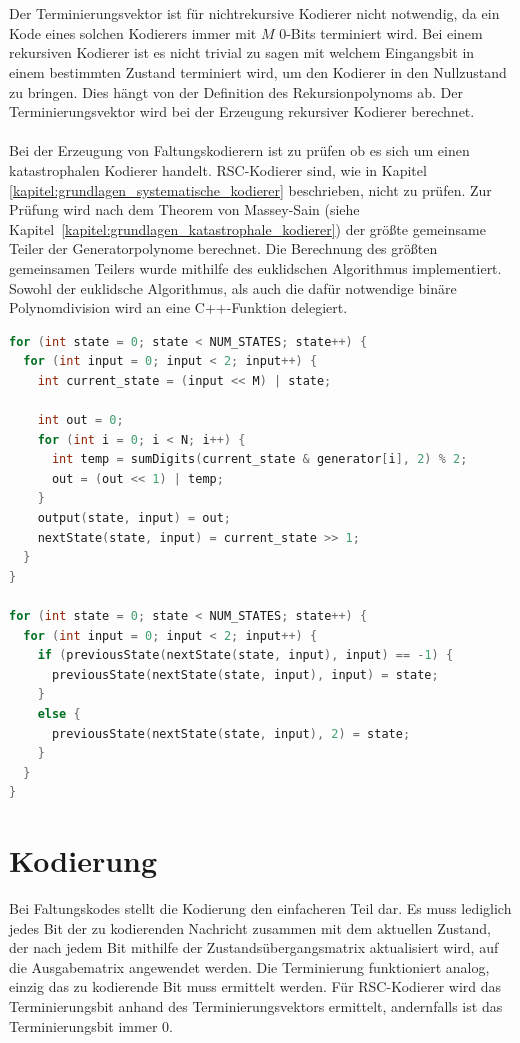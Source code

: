\\
\\
Der Terminierungsvektor ist für nichtrekursive Kodierer nicht notwendig, da ein Kode eines solchen Kodierers immer mit $M$ 0-Bits terminiert wird. Bei einem rekursiven Kodierer ist es nicht trivial zu sagen mit welchem Eingangsbit in einem bestimmten Zustand terminiert wird, um den Kodierer in den Nullzustand zu bringen. Dies hängt von der Definition des Rekursionpolynoms ab. Der Terminierungsvektor wird bei der Erzeugung rekursiver Kodierer berechnet.
\\
\\
Bei der Erzeugung von Faltungskodierern ist zu prüfen ob es sich um einen katastrophalen Kodierer handelt. RSC-Kodierer sind, wie in Kapitel \ref{kapitel:grundlagen_systematische_kodierer} beschrieben, nicht zu prüfen. Zur Prüfung wird nach dem Theorem von Massey-Sain (siehe Kapitel~\ref{kapitel:grundlagen_katastrophale_kodierer}) der größte gemeinsame Teiler der Generatorpolynome berechnet. Die Berechnung des größten gemeinsamen Teilers wurde mithilfe des euklidschen Algorithmus implementiert. Sowohl der euklidsche Algorithmus, als auch die dafür notwendige binäre Polynomdivision wird an eine C++-Funktion delegiert.
\begin{lstlisting}[language=C++,caption=Codeausschnitt der Implementierung der Erzeugung von Faltungskodierer, label={lst:generate_coder}, float=!th, basicstyle=\ttfamily\scriptsize]
for (int state = 0; state < NUM_STATES; state++) {
  for (int input = 0; input < 2; input++) {
    int current_state = (input << M) | state;

    int out = 0;
    for (int i = 0; i < N; i++) {
      int temp = sumDigits(current_state & generator[i], 2) % 2;
      out = (out << 1) | temp;
    }
    output(state, input) = out;
    nextState(state, input) = current_state >> 1;
  }
}

for (int state = 0; state < NUM_STATES; state++) {
  for (int input = 0; input < 2; input++) {
    if (previousState(nextState(state, input), input) == -1) {
      previousState(nextState(state, input), input) = state;
    }
    else {
      previousState(nextState(state, input), 2) = state;
    }
  }
}
\end{lstlisting}
\section{Kodierung}
\label{kapitel:implementierung_kodierung}
Bei Faltungskodes stellt die Kodierung den einfacheren Teil dar. Es muss lediglich jedes Bit der zu kodierenden Nachricht zusammen mit dem aktuellen Zustand, der nach jedem Bit mithilfe der Zustandsübergangsmatrix aktualisiert wird, auf die Ausgabematrix angewendet werden. Die Terminierung funktioniert analog, einzig das zu kodierende Bit muss ermittelt werden. Für RSC-Kodierer wird das Terminierungsbit anhand des Terminierungsvektors ermittelt, andernfalls ist das Terminierungsbit immer 0.

